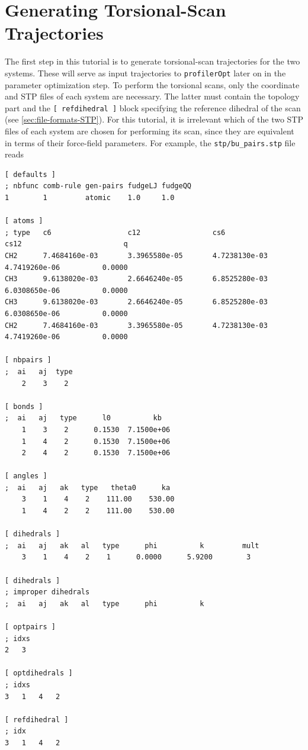 \documentclass[10pt,a4paper]{report}
\numberwithin{equation}{section}
\newcommand{\under}{\_}
\newcommand{\profileropt}[0]{\texttt{profilerOpt}}
\begin{document}
\section{Generating Torsional-Scan Trajectories}
\label{sec:tutorial-profilergen}

The first step in this tutorial is to generate torsional-scan
trajectories for the two systems.
%
These will serve as input trajectories to \profileropt{} later on in
the parameter optimization step.
%
To perform the torsional scans, only the coordinate and
STP files of each system are necessary.
%
The latter must contain the topology part and the
\texttt{[~refdihedral~]} block specifying the reference dihedral of
the scan (see \autoref{sec:file-formats-STP}).
%
For this tutorial, it is irrelevant which of the two STP files of each
system are chosen for performing its scan, since they are equivalent
in terms of their force-field parameters.
%
%
For example, the \texttt{stp/bu\under{}pairs.stp} file reads

\begin{lstlisting}[language=gromacs]
[ defaults ]
; nbfunc comb-rule gen-pairs fudgeLJ fudgeQQ
1        1         atomic    1.0     1.0

[ atoms ]
; type   c6                  c12                 cs6                 cs12                        q
CH2      7.4684160e-03       3.3965580e-05       4.7238130e-03       4.7419260e-06          0.0000
CH3      9.6138020e-03       2.6646240e-05       6.8525280e-03       6.0308650e-06          0.0000
CH3      9.6138020e-03       2.6646240e-05       6.8525280e-03       6.0308650e-06          0.0000
CH2      7.4684160e-03       3.3965580e-05       4.7238130e-03       4.7419260e-06          0.0000

[ nbpairs ]
;  ai   aj  type
    2    3    2     

[ bonds ]
;  ai   aj   type      l0          kb
    1    3    2      0.1530  7.1500e+06 
    1    4    2      0.1530  7.1500e+06 
    2    4    2      0.1530  7.1500e+06 

[ angles ]
;  ai   aj   ak   type   theta0      ka
    3    1    4    2    111.00    530.00 
    1    4    2    2    111.00    530.00 

[ dihedrals ]
;  ai   aj   ak   al   type      phi          k         mult
    3    1    4    2    1      0.0000      5.9200        3 

[ dihedrals ]
; improper dihedrals
;  ai   aj   ak   al   type      phi          k         

[ optpairs ]
; idxs
2   3   

[ optdihedrals ]
; idxs
3   1   4   2   

[ refdihedral ]
; idx
3   1   4   2
\end{lstlisting}\vspace{-2ex}\par
\end{document}
